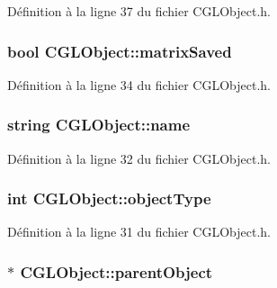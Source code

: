 Définition à la ligne 37 du fichier C\-G\-L\-Object.\-h.

\hypertarget{class_c_g_l_object_a82401873b76121a112af9b824a661ba1}{
\subsubsection[{matrix\-Saved}]{\setlength{\rightskip}{0pt plus 5cm}bool C\-G\-L\-Object\-::matrix\-Saved\hspace{0.3cm}{\ttfamily [protected]}}}\label{class_c_g_l_object_a82401873b76121a112af9b824a661ba1}


Définition à la ligne 34 du fichier C\-G\-L\-Object.\-h.

\hypertarget{class_c_g_l_object_a0397e47d30fd9a5eb57cce07e4b02bce}{
\subsubsection[{name}]{\setlength{\rightskip}{0pt plus 5cm}string C\-G\-L\-Object\-::name\hspace{0.3cm}{\ttfamily [protected]}}}\label{class_c_g_l_object_a0397e47d30fd9a5eb57cce07e4b02bce}


Définition à la ligne 32 du fichier C\-G\-L\-Object.\-h.

\hypertarget{class_c_g_l_object_a5ff11ea98cb278213849d6a6f4124cdc}{
\subsubsection[{object\-Type}]{\setlength{\rightskip}{0pt plus 5cm}int C\-G\-L\-Object\-::object\-Type\hspace{0.3cm}{\ttfamily [protected]}}}\label{class_c_g_l_object_a5ff11ea98cb278213849d6a6f4124cdc}


Définition à la ligne 31 du fichier C\-G\-L\-Object.\-h.

\hypertarget{class_c_g_l_object_a445899f0f0a263df4780ccf75103c2a9}{
\subsubsection[{parent\-Object}]{$\ast$ C\-G\-L\-Object\-::parent\-Object\hspace{0.3cm}{\ttfamily [protected]}}}\label{class_c_g_l_object_a445899f0f0a263df4780ccf75103c2a9}


